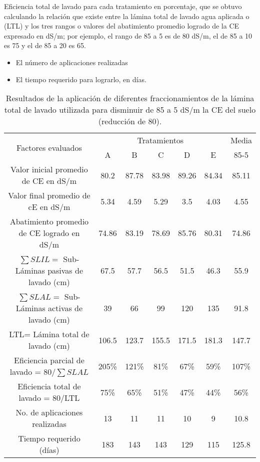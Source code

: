 Eficiencia total de lavado para cada tratamiento en porcentaje, que se obtuvo calculando la relación que existe entre la lámina total de lavado agua aplicada o (LTL) y los tres rangos o valores del abatimiento promedio logrado de la CE expresado en dS/m; por ejemplo, el rango de 85 a 5 es de 80 dS/m, el de 85 a 10 es 75 y el de 85 a 20 es 65.
\begin{itemize}
    \item El número de aplicaciones realizadas
    \item El tiempo requerido para lograrlo, en días.
\end{itemize}
\begin{table}[h!]
    \centering
    \begin{tabular}{@{}ccccccc@{}}
    \toprule
    \multirow{2}{*}{Factores evaluados}             & \multicolumn{5}{c}{Tratamientos}      & Media \\ \cmidrule(l){2-7} 
                                                    & A     & B     & C     & D     & E     & 85-5  \\ \midrule
    Valor inicial promedio de CE en dS/m            & 80.2  & 87.78 & 83.98 & 89.26 & 84.34 & 85.11 \\
    Valor final promedio de cE en dS/m              & 5.34  & 4.59  & 5.29  & 3.5   & 4.03  & 4.55  \\
    Abatimiento promedio de CE logrado en dS/m      & 74.86 & 83.19 & 78.69 & 85.76 & 80.31 & 74.86 \\
    $\sum SLIL=$ Sub-Láminas pasivas de lavado (cm) & 67.5  & 57.7  & 56.5  & 51.5  & 46.3  & 55.9  \\
    $\sum SLAL=$ Sub-Láminas activas de lavado (cm) & 39    & 66    & 99    & 120   & 135   & 91.8  \\
    LTL= Lámina total de lavado (cm)                & 106.5 & 123.7 & 155.5 & 171.5 & 181.3 & 147.7 \\
    Eficiencia parcial de lavado = 80/$\sum SLAL$   & 205\% & 121\% & 81\%  & 67\%  & 59\%  & 107\% \\
    Eficiencia total de lavado = 80/LTL             & 75\%  & 65\%  & 51\%  & 47\%  & 44\%  & 56\%  \\
    No. de aplicaciones realizadas                  & 13    & 11    & 11    & 10    & 9     & 10.8  \\
    Tiempo requerido (días)                         & 183   & 143   & 143   & 129   & 115   & 125.8 \\ \bottomrule
    \end{tabular}
    \caption{Resultados de la aplicación de diferentes fraccionamientos de la lámina total de lavado utilizada para disminuir de 85 a 5 dS/m la CE del suelo (reducción de 80).}
    \label{tabsa36}
\end{table}
